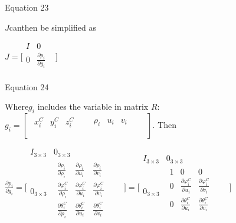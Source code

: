 \begin{center}Equation 23\end{center}

$J$canthen be simplified as

$J=\lbrack \begin{matrix}
I & 0 & \\
0 & \frac{\partial p_{i}}{\partial g_{i}} & \\
\end{matrix}
\rbrack $\\


\begin{center}Equation 24\end{center}

Where$g_{i}$ includes the variable in matrix $R$: $
g_{i}=[\begin{matrix}
\begin{matrix}
x_{i}^{C} & y_{i}^{C} & z_{i}^{C} & \\
\end{matrix}
 & \begin{matrix}
\rho _{i} & u_{i} & v_{i} & \\
\end{matrix}
 & \\
\end{matrix}
]$. Then 

$\frac{\partial p_{i}}{\partial g_{i}}=\lbrack \begin{matrix}
I_{3\times 3} & 0_{3\times 3} & \\
0_{3\times 3} & \begin{matrix}
\frac{\partial \rho _{i}}{\partial \rho _{i}} & \frac{\partial \rho 
_{i}}{\partial u_{i}} & \frac{\partial \rho _{i}}{\partial v_{i}} & \\
\frac{\partial \varphi _{i}^{C}}{\partial \rho _{i}} & \frac{\partial 
\varphi _{i}^{C}}{\partial u_{i}} & \frac{\partial \varphi 
_{i}^{C}}{\partial v_{i}} & \\
\frac{\partial \theta _{i}^{C}}{\partial \rho _{i}} & \frac{\partial 
\theta _{i}^{C}}{\partial u_{i}} & \frac{\partial \theta 
_{i}^{C}}{\partial v_{i}} & \\
\end{matrix}
 & \\
\end{matrix}
\rbrack =\lbrack \begin{matrix}
I_{3\times 3} & 0_{3\times 3} & \\
0_{3\times 3} & \begin{matrix}
1 & 0 & 0 & \\
0 & \frac{\partial \varphi _{i}^{C}}{\partial u_{i}} & \frac{\partial 
\varphi _{i}^{C}}{\partial v_{i}} & \\
0 & \frac{\partial \theta _{i}^{C}}{\partial u_{i}} & \frac{\partial 
\theta _{i}^{C}}{\partial v_{i}} & \\
\end{matrix}
 & \\
\end{matrix}
\rbrack $\\


